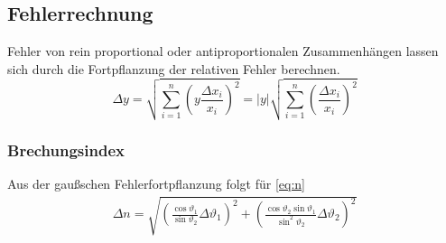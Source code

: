 \label{anhang}

\subsection{Fehlerrechnung}
Fehler von rein proportional oder antiproportionalen Zusammenhängen lassen sich durch die Fortpflanzung der relativen Fehler berechnen.
\begin{equation}
	\Delta y = \sqrt{\sum_{i=1}^{n}\left(y\frac{\Delta x_i}{x_i}\right)^2} 
		= |y|\sqrt{\sum_{i=1}^{n}\left(\frac{\Delta x_i}{x_i}\right)^2}  \label{eq:err}
\end{equation}

\subsubsection{Brechungsindex}
Aus der gaußschen Fehlerfortpflanzung folgt für \eqref{eq:n}
\begin{align}
	\Delta n = \sqrt{\left(\frac{\cos \vartheta_{1}}{\sin \vartheta_{2}} \Delta \vartheta_{1}\right)^2 + \left(\frac{\cos \vartheta_{2}\sin \vartheta_{1} }{\sin^2 \vartheta_{2}} \Delta \vartheta_{2} \right)^2} \label{eq:err:n}
\end{align}

